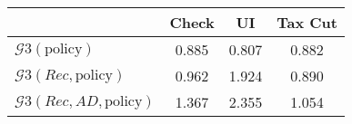\begin{tabular}{@{}lccc@{}} 
\toprule 
                          & Check      & UI    & Tax Cut    \\  \midrule 
$\mathcal{G}3(\text{policy})$ & 0.885  & 0.807  & 0.882     \\ 
$\mathcal{G}3(Rec,\text{policy})$ & 0.962  & 1.924  & 0.890     \\ 
$\mathcal{G}3(Rec, AD,\text{policy})$ & 1.367  & 2.355  & 1.054     \\ 
\end{tabular}  
